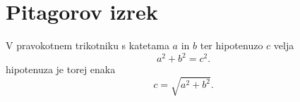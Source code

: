 \documentclass{article}
\begin{document}
\section*{Pitagorov izrek}
V pravokotnem trikotniku s katetama \(a\) in \(b\) ter hipotenuzo \(c\) velja
\[ a^2 + b^2 = c^2. \]
hipotenuza je torej enaka
\[c = \sqrt{a^2 +b^2}.\]
\end{document}
